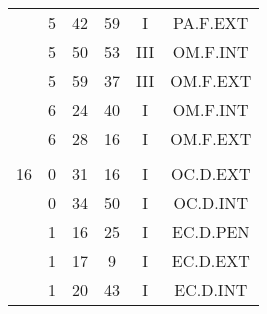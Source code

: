 \documentclass[12pt, a4paper]{article}
\begin{document}
\begin{multicols}{3}
{\begin{tabular}{c c c c c c}
	 	 	 	 & 5 & 42 & 59 & I & PA.F.EXT\\%
	 	 	 	 & 5 & 50 & 53 & III & OM.F.INT\\%
	 	 	 	 & 5 & 59 & 37 & III & OM.F.EXT\\%
	 	 	 	 & 6 & 24 & 40 & I & OM.F.INT\\%
	 	 	 	 & 6 & 28 & 16 & I & OM.F.EXT\\%
	 	 	 	 & & & & & \\%
	 	 	 	16 & 0 & 31 & 16 & I & OC.D.EXT\\%
	 	 	 	 & 0 & 34 & 50 & I & OC.D.INT\\%
	 	 	 	 & 1 & 16 & 25 & I & EC.D.PEN\\%
	 	 	 	 & 1 & 17 & 9 & I & EC.D.EXT\\%
	 	 	 	 & 1 & 20 & 43 & I & EC.D.INT\\%
	 	 \end{tabular}
 	}
\end{multicols}
\end{document}
